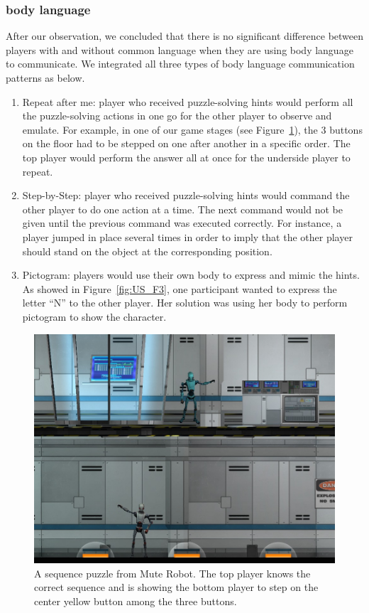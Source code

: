 \subsubsection{body language}
After our observation, we concluded that there is no significant difference between players with and without common language when they are using body language to communicate. We integrated all three types of body language communication patterns as below.

\begin{enumerate}
  \item Repeat after me: player who received puzzle-solving hints would perform all the puzzle-solving actions in one go for the other player to observe and emulate. For example, in one of our game stages (see Figure~\ref{fig:US_F2}), the 3 buttons on the floor had to be stepped on one after another in a specific order. The top player would perform the answer all at once for the underside player to repeat. 
 
  \item Step-by-Step: player who received puzzle-solving hints would command the other player to do one action at a time. The next command would not be given until the previous command was executed correctly. For instance, a player jumped in place several times in order to imply that the other player should stand on the object at the corresponding position.
                                  
  \item Pictogram: players would use their own body to express and mimic the hints. As showed in Figure~\ref{fig:US_F3}, one participant wanted to express the letter ``N'' to the other player. Her solution was using her body to perform pictogram to show the character.
\end{enumerate}

\begin{figure}[!h]
\centering
\includegraphics[width=0.7\columnwidth]{Figures/US_F2.jpg}
\caption{A sequence puzzle from Mute Robot. The top player knows the correct sequence and is showing the bottom player to step on the center yellow button among the three buttons.}
\label{fig:US_F2}
\end{figure}

